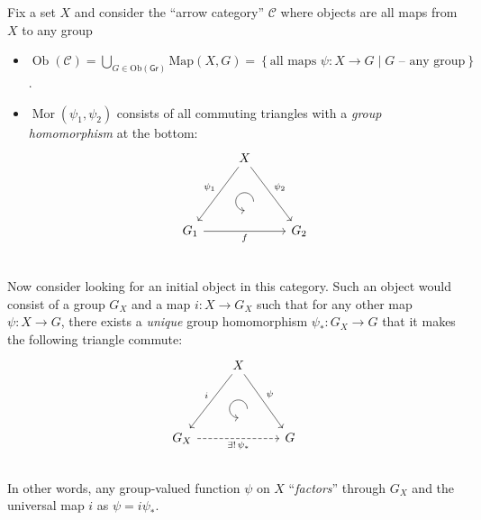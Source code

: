 \documentclass[english,letterpaper]{article}%
\numberwithin{equation}{section}
\numberwithin{figure}{section}
\numberwithin{table}{section}
\theoremstyle{definition}
\theoremstyle{definition}
\theoremstyle{definition}
\theoremstyle{plain}
\theoremstyle{plain}
\theoremstyle{plain}
\theoremstyle{plain}
\theoremstyle{remark}
\theoremstyle{remark}
\DeclareMathOperator{\mor}{Mor}
\DeclareMathOperator{\ob}{Ob}
\begin{document}
\begin{example}
Fix a set $X$ and consider the ``arrow category'' $\mathcal{C}$
where objects are all maps from $X$ to any group
\begin{itemize}
\item $\ob\left(\mathcal{C}\right)=\bigcup_{G\in\mathrm{Ob}(\mathsf{Gr})}\mathrm{Map}(X,G)=\left\{ \text{all maps }\psi:X\to G\mid G\text{ -- any group}\right\}$.
\item $\mor\left(\psi_{1},\psi_{2}\right)$ consists of all commuting triangles
with a \emph{group homomorphism} at the bottom:
\[\begin{tikzcd}[every matrix/.append style={name=m},   
execute at end picture={\draw [<-] ([xshift=0mm,yshift=-6mm]m-2-2.north) arc[start angle=-90,delta angle=-270,radius=0.25cm];}]
   & X\arrow[ddl,swap,"\psi_1" ]\arrow[ddr,"\psi_2"] & \\
   & \, & \\
   G_1 \arrow[rr,swap,"f"]& & G_2\\
\end{tikzcd}\]
\end{itemize}
Now consider looking for an initial object in this category. Such
an object would consist of a group $G_{X}$ and a map $i:X\to G_{X}$
such that for any other map $\psi:X\to G$, there exists a \emph{unique}
group homomorphism $\psi_{\ast}:G_{X}\to G$ that it makes the following
triangle commute:\[\begin{tikzcd}[every matrix/.append style={name=m},   
execute at end picture={\draw [<-] ([xshift=0mm,yshift=-6mm]m-2-2.north) arc[start angle=-90,delta angle=-270,radius=0.25cm];}]
   & X\arrow[ddl,swap,"i" ]\arrow[ddr,"\psi"] & \\
   & \, & \\
   G_X \arrow[rr,dashed,swap,"\exists!\,\psi_\ast"]& & G\\
\end{tikzcd}\]In other words, any group-valued function $\psi$ on $X$ ``\emph{factors}''
through $G_{X}$ and the universal map $i$ as $\psi=i\psi_{\ast}$.


\end{example}
\end{document}
